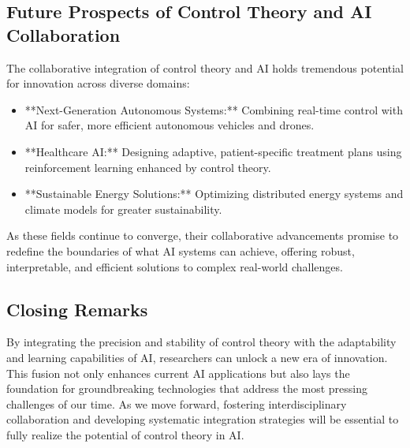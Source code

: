 \documentclass{IEEEojcsys}
\begin{document}
\subsection{Future Prospects of Control Theory and AI Collaboration}
The collaborative integration of control theory and AI holds tremendous potential for innovation across diverse domains:
\begin{itemize}
    \item **Next-Generation Autonomous Systems:** Combining real-time control with AI for safer, more efficient autonomous vehicles and drones.
    \item **Healthcare AI:** Designing adaptive, patient-specific treatment plans using reinforcement learning enhanced by control theory.
    \item **Sustainable Energy Solutions:** Optimizing distributed energy systems and climate models for greater sustainability.
\end{itemize}
As these fields continue to converge, their collaborative advancements promise to redefine the boundaries of what AI systems can achieve, offering robust, interpretable, and efficient solutions to complex real-world challenges.

\subsection{Closing Remarks}
By integrating the precision and stability of control theory with the adaptability and learning capabilities of AI, researchers can unlock a new era of innovation. This fusion not only enhances current AI applications but also lays the foundation for groundbreaking technologies that address the most pressing challenges of our time. As we move forward, fostering interdisciplinary collaboration and developing systematic integration strategies will be essential to fully realize the potential of control theory in AI.
\end{document}
